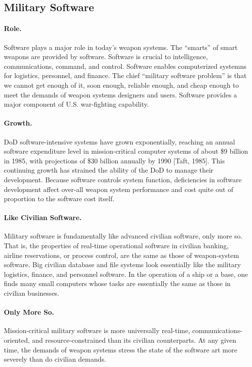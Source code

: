 \documentclass[12pt,final]{article}
\begin{document}
\subsection{Military Software}

\paragraph{Role.} Software plays a major role in today’s weapon systems. The
“smarts” of smart weapons are provided by software. Software is crucial to
intelligence, communications, command, and control. Software enables
computerized systemns for logistics, personnel, and finance. The chief
“military software problem” is that we cannot get enough of it, soon enough,
reliable enough, and cheap enough to meet the demands of weapon systems
designers and users. Software provides a major component of U.S. war-fighting
capability.

\paragraph{Growth.} DoD software-intensive systems have grown exponentially,
reaching an annual software expenditure level in mission-critical computer
systems of about \$9 billion in 1985, with projections of \$30 billion annually
by 1990 [Taft, 1985].  This continuing growth has strained the ability of the
DoD to manage their development. Because software controls system function,
deficiencies in software development affect over-all weapon system performance
and cost quite out of proportion to the software cost itself.

\paragraph{Like Civilian Software.} Military software is fundamentally like
advanced civilian software, only more so. That is, the properties of real-time
operational software in civilian banking, airline reservations, or process
control, are the same as those of weapon-system software. Big civilian
database and file systems look essentially like the military logistics,
finance, and personnel software. In the operation of a ship or a base, one
finds many small computers whose tasks are essentially the same as those in
civilian businesses.

\paragraph{Only More So.} Mission-critical military software is more
universally real-time, communications-oriented, and resource-constrained than
its civilian counterparts. At any given time, the demands of weapon systems
stress the state of the software art more severely than do civilian demands.
\end{document}
